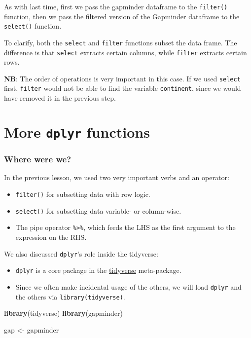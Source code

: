 \documentclass[]{book}
\newenvironment{Shaded}{\begin{snugshade}}{\end{snugshade}}
\newcommand{\KeywordTok}[1]{\textcolor[rgb]{0.13,0.29,0.53}{\textbf{#1}}}
\newcommand{\StringTok}[1]{\textcolor[rgb]{0.31,0.60,0.02}{#1}}
\newcommand{\NormalTok}[1]{#1}
\providecommand{\tightlist}{%
  \setlength{\itemsep}{0pt}\setlength{\parskip}{0pt}}
\begin{document}
As with last time, first we pass the gapminder dataframe to the
\texttt{filter()} function, then we pass the filtered version of the
Gapminder dataframe to the \texttt{select()} function.

To clarify, both the \texttt{select} and \texttt{filter} functions
subset the data frame. The difference is that \texttt{select} extracts
certain columns, while \texttt{filter} extracts certain rows.

\textbf{NB}: The order of operations is very important in this case. If
we used \texttt{select} first, \texttt{filter} would not be able to find
the variable \texttt{continent}, since we would have removed it in the
previous step.

\section{\texorpdfstring{More \texttt{dplyr}
functions}{More dplyr functions}}\label{more-dplyr-functions}

\subsubsection*{Where were we?}\label{where-were-we}

In the previous lesson, we used two very important verbs and an
operator:

\begin{itemize}
\tightlist
\item
  \texttt{filter()} for subsetting data with row logic.
\item
  \texttt{select()} for subsetting data variable- or column-wise.
\item
  The pipe operator \texttt{\%\textgreater{}\%}, which feeds the LHS as
  the first argument to the expression on the RHS.
\end{itemize}

We also discussed \texttt{dplyr}'s role inside the tidyverse:

\begin{itemize}
\tightlist
\item
  \texttt{dplyr} is a core package in the
  \href{tidyverse-github}{tidyverse} meta-package.
\item
  Since we often make incidental usage of the others, we will load
  \texttt{dplyr} and the others via \texttt{library(tidyverse)}.
\end{itemize}

\begin{Shaded}
\begin{Highlighting}[]
\KeywordTok{library}\NormalTok{(tidyverse)}
\KeywordTok{library}\NormalTok{(gapminder)}

\NormalTok{gap <-}\StringTok{ }\NormalTok{gapminder}
\end{Highlighting}
\end{Shaded}
\end{document}
